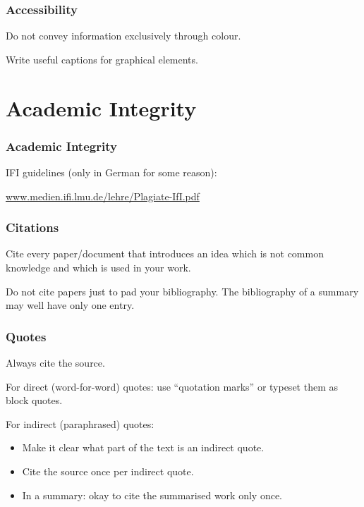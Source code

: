 \documentclass[xetex]{beamer}
\begin{document}
\begin{frame}
  \frametitle{Accessibility}

  Do not convey information exclusively through colour.

  \medskip
  \pause

  Write useful captions for graphical elements.
\end{frame}

\section{Academic Integrity}

\begin{frame}
  \frametitle{Academic Integrity}

  IFI guidelines (only in German for some reason):

  \medskip

  \url{www.medien.ifi.lmu.de/lehre/Plagiate-IfI.pdf}
\end{frame}

\begin{frame}
  \frametitle{Citations}

  Cite every paper/document that introduces an idea which is not common knowledge and which is used in your work.

  \medskip
  \pause

  Do not cite papers just to pad your bibliography.
  The bibliography of a summary may well have only one entry.
\end{frame}

\begin{frame}
  \frametitle{Quotes}

  Always cite the source.

  \medskip
  \pause

  For direct (word-for-word) quotes: use \enquote{quotation marks} or typeset them as block quotes.

  \medskip
  \pause

  For indirect (paraphrased) quotes:
  \begin{itemize}
    \item Make it clear what part of the text is an indirect quote.
    \item Cite the source once per indirect quote.
    \item In a summary: okay to cite the summarised work only once.
  \end{itemize}
\end{frame}
\end{document}
